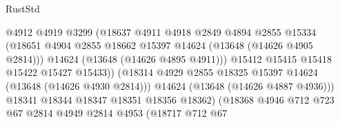 \begin{lexlean}{RustStd}
\begin{coremodule}
                                            @4912
                                            @4919
                                            @3299
                                            (@18637
                                              @4911
                                              @4918
                                              @2849
                                              @4894
                                              @2855
                                              @15334
                                              (@18651
                                                @4904
                                                @2855
                                                @18662
                                                @15397
                                                @14624
                                                (@13648 (@14626 @4905 @2814)))
                                              @14624
                                              (@13648 (@14626 @4895 @4911)))
                                            @15412
                                            @15415
                                            @15418
                                            @15422
                                            @15427
                                            @15433))
                                        (@18314
                                          @4929
                                          @2855
                                          @18325
                                          @15397
                                          @14624
                                          (@13648 (@14626 @4930 @2814)))
                                        @14624
                                        (@13648 (@14626 @4887 @4936)))
                                      @18341
                                      @18344
                                      @18347
                                      @18351
                                      @18356
                                      @18362)
                                    (@18368
                                      @4946
                                      @712
                                      @723
                                      @67
                                      @2814
                                      @4949
                                      @2814
                                      @4953
                                      (@18717
                                        @712
                                        @67

\end{coremodule}
\end{lexlean}
